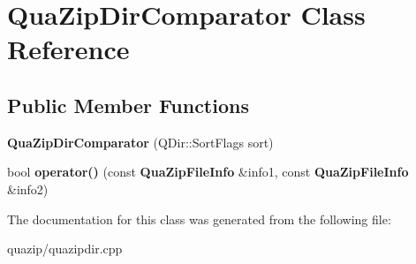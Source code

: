 \section{QuaZipDirComparator Class Reference}
\label{classQuaZipDirComparator}
\subsection*{Public Member Functions}
\begin{DoxyCompactItemize}
\item 
{\bfseries QuaZipDirComparator} (QDir::SortFlags sort)\label{classQuaZipDirComparator_aa1db8f4aa9a2df464ac511a5af2c9927}

\item 
bool {\bfseries operator()} (const {\bf QuaZipFileInfo} \&info1, const {\bf QuaZipFileInfo} \&info2)\label{classQuaZipDirComparator_a40363def9192825e0d349cad148e964b}

\end{DoxyCompactItemize}


The documentation for this class was generated from the following file:\begin{DoxyCompactItemize}
\item 
quazip/quazipdir.cpp\end{DoxyCompactItemize}
